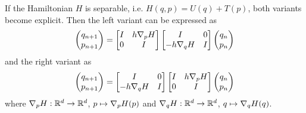 \documentclass[twoside,a4paper]{article}
\begin{document}
If the Hamiltonian $H$ is separable, i.e. $H(q,p) = U(q) + T(p)$, both variants
become explicit. Then the left variant can be expressed as
\begin{equation*}
	\begin{pmatrix}
		q_{n+1} \\
		p_{n+1}
	\end{pmatrix} =
	\begin{bmatrix}
		I & h \grad[p]{H} \\
		0 & I
	\end{bmatrix} \begin{bmatrix}
		I & 0 \\
		-h \grad[q]{H} & I
	\end{bmatrix}
	\begin{pmatrix}
		q_{n} \\
		p_{n}
	\end{pmatrix} 
\end{equation*}
and the right variant as
\begin{equation*}
	\begin{pmatrix}
		q_{n+1} \\
		p_{n+1}
	\end{pmatrix} =
	\begin{bmatrix}
		I & 0 \\
		-h \grad[q]{H} & I
	\end{bmatrix}
	\begin{bmatrix}
		I & h \grad[p]{H} \\
		0 & I
	\end{bmatrix}
	\begin{pmatrix}
		q_{n} \\
		p_{n}
	\end{pmatrix}
\end{equation*}
where $\grad[p]{H} : \mathbb{R}^d \to \mathbb{R}^d$, $p \mapsto \grad[p]{H}(p)$ 
and $\grad[q]{H} : \mathbb{R}^d \to \mathbb{R}^d$, $q \mapsto \grad[q]{H}(q)$.
\end{document}
